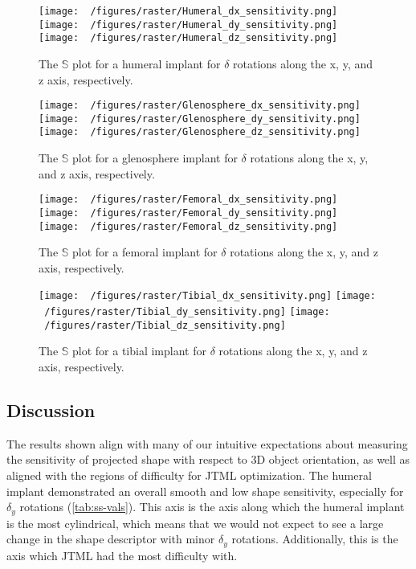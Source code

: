 \begin{figure}[h!]
	\centering
	\texttt{[image: ~/figures/raster/Humeral\_dx\_sensitivity.png]}
	\texttt{[image: ~/figures/raster/Humeral\_dy\_sensitivity.png]}
	\texttt{[image: ~/figures/raster/Humeral\_dz\_sensitivity.png]}
	\caption{The $\mathbb{S}$ plot for a humeral implant for $\delta$ rotations along the x, y, and z axis, respectively.}
	\label{fig:hum_sensitivity_plot}
\end{figure}

\begin{figure}[h!]
	\centering
	\texttt{[image: ~/figures/raster/Glenosphere\_dx\_sensitivity.png]}
	\texttt{[image: ~/figures/raster/Glenosphere\_dy\_sensitivity.png]}
	\texttt{[image: ~/figures/raster/Glenosphere\_dz\_sensitivity.png]}
	\caption{The $\mathbb{S}$ plot for a glenosphere implant for $\delta$ rotations along the x, y, and z axis, respectively.}
	\label{fig:sca_sensitivity_plot}
\end{figure}
\begin{figure}[h!]
	\centering
	\texttt{[image: ~/figures/raster/Femoral\_dx\_sensitivity.png]}
	\texttt{[image: ~/figures/raster/Femoral\_dy\_sensitivity.png]}
	\texttt{[image: ~/figures/raster/Femoral\_dz\_sensitivity.png]}
	\caption{The $\mathbb{S}$ plot for a femoral implant for $\delta$ rotations along the x, y, and z axis, respectively.}
	\label{fig:fem_sensitivity_plot}
\end{figure}
\begin{figure}[h!]
	\centering
	\texttt{[image: ~/figures/raster/Tibial\_dx\_sensitivity.png]}
	\texttt{[image: ~/figures/raster/Tibial\_dy\_sensitivity.png]}
	\texttt{[image: ~/figures/raster/Tibial\_dz\_sensitivity.png]}
	\caption{The $\mathbb{S}$ plot for a tibial implant for $\delta$ rotations along the x, y, and z axis, respectively.}
	\label{fig:tib_sensitivity_plot}
\end{figure}


\subsection{Discussion}
The results shown align with many of our intuitive expectations about measuring the sensitivity of projected shape with respect to 3D object orientation, as well as aligned with the regions of difficulty for JTML optimization.
The humeral implant demonstrated an overall smooth and low shape sensitivity, especially for $\delta_{y}$ rotations (\cref{tab:ss-vals}).
This axis is the axis along which the humeral implant is the most cylindrical, which means that we would not expect to see a large change in the shape descriptor with minor $\delta_{y}$ rotations.
Additionally, this is the axis which JTML had the most difficulty with.

